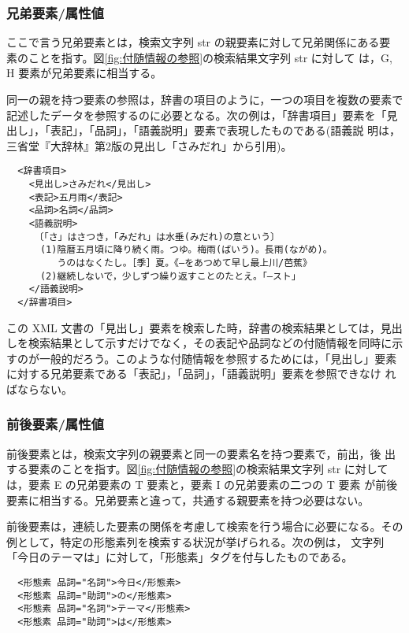 \subsubsection{兄弟要素/属性値}
ここで言う兄弟要素とは，検索文字列 str の親要素に対して兄弟関係にある要
素のことを指す。図\ref{fig:付随情報の参照}の検索結果文字列 str に対して
は，G, H 要素が兄弟要素に相当する。

同一の親を持つ要素の参照は，辞書の項目のように，一つの項目を複数の要素で
記述したデータを参照するのに必要となる。次の例は，「辞書項目」要素を「見
出し」，「表記」，「品詞」，「語義説明」要素で表現したものである(語義説
明は，三省堂『大辞林』第2版の見出し「さみだれ」から引用)。

\begin{verbatim}
  <辞書項目>
    <見出し>さみだれ</見出し>
    <表記>五月雨</表記>
    <品詞>名詞</品詞>
    <語義説明>
     〔「さ」はさつき，「みだれ」は水垂(みだれ)の意という〕
      (1)陰暦五月頃に降り続く雨。つゆ。梅雨(ばいう)。長雨(ながめ)。
         うのはなくたし。［季］夏。《—をあつめて早し最上川/芭蕉》
      (2)継続しないで，少しずつ繰り返すことのたとえ。「—スト」
    </語義説明>
  </辞書項目>
\end{verbatim}

この XML 文書の「見出し」要素を検索した時，辞書の検索結果としては，見出
しを検索結果として示すだけでなく，その表記や品詞などの付随情報を同時に示
すのが一般的だろう。このような付随情報を参照するためには，「見出し」要素
に対する兄弟要素である「表記」，「品詞」，「語義説明」要素を参照できなけ
ればならない。


\subsubsection{前後要素/属性値}
前後要素とは，検索文字列の親要素と同一の要素名を持つ要素で，前出，後
出する要素のことを指す。図\ref{fig:付随情報の参照}の検索結果文字列 str
に対しては，要素 E の兄弟要素の T 要素と，要素 I の兄弟要素の二つの T 要素
が前後要素に相当する。兄弟要素と違って，共通する親要素を持つ必要はない。

前後要素は，連続した要素の関係を考慮して検索を行う場合に必要になる。その
例として，特定の形態素列を検索する状況が挙げられる。次の例は，
文字列「今日のテーマは」に対して，「形態素」タグを付与したものである。

\begin{verbatim}
  <形態素 品詞="名詞">今日</形態素>
  <形態素 品詞="助詞">の</形態素>
  <形態素 品詞="名詞">テーマ</形態素>
  <形態素 品詞="助詞">は</形態素>
\end{verbatim}

